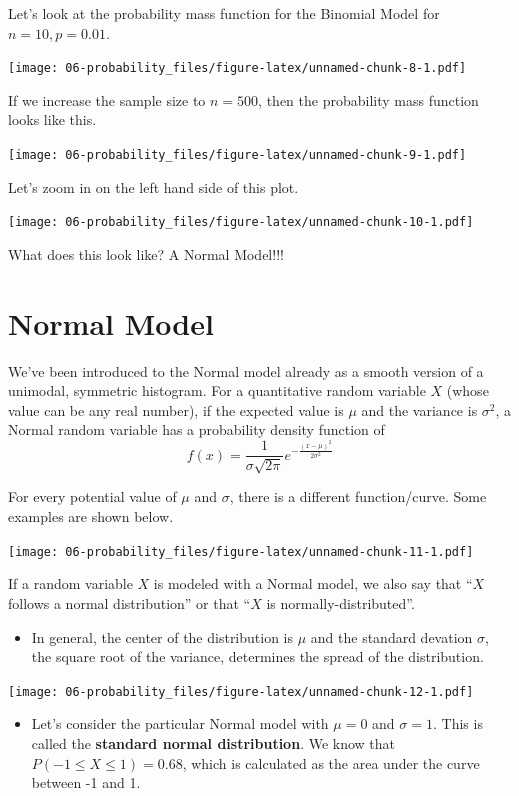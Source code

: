 \documentclass[
]{book}
\providecommand{\tightlist}{%
  \setlength{\itemsep}{0pt}\setlength{\parskip}{0pt}}
\begin{document}
Let's look at the probability mass function for the Binomial Model for \(n = 10, p = 0.01\).

\texttt{[image: 06-probability\_files/figure-latex/unnamed-chunk-8-1.pdf]}

If we increase the sample size to \(n = 500\), then the probability mass function looks like this.

\texttt{[image: 06-probability\_files/figure-latex/unnamed-chunk-9-1.pdf]}

Let's zoom in on the left hand side of this plot.

\texttt{[image: 06-probability\_files/figure-latex/unnamed-chunk-10-1.pdf]}

What does this look like? A Normal Model!!!

\hypertarget{normal-model}{%
\section{Normal Model}\label{normal-model}}

We've been introduced to the Normal model already as a smooth version of a unimodal, symmetric histogram. For a quantitative random variable \(X\) (whose value can be any real number), if the expected value is \(\mu\) and the variance is \(\sigma^2\), a Normal random variable has a probability density function of
\[f(x) =  \frac{1}{\sigma\sqrt{2\pi}}e^{-\frac{(x-\mu)^2}{2\sigma^2}}\]

For every potential value of \(\mu\) and \(\sigma\), there is a different function/curve. Some examples are shown below.

\texttt{[image: 06-probability\_files/figure-latex/unnamed-chunk-11-1.pdf]}

If a random variable \(X\) is modeled with a Normal model, we also say that ``\(X\) follows a normal distribution'' or that ``\(X\) is normally-distributed''.

\begin{itemize}
\tightlist
\item
  In general, the center of the distribution is \(\mu\) and the standard devation \(\sigma\), the square root of the variance, determines the spread of the distribution.
\end{itemize}

\texttt{[image: 06-probability\_files/figure-latex/unnamed-chunk-12-1.pdf]}

\begin{itemize}
\tightlist
\item
  Let's consider the particular Normal model with \(\mu=0\) and \(\sigma=1\). This is called the \textbf{standard normal distribution}. We know that \(P(-1\leq X \leq 1) = 0.68\), which is calculated as the area under the curve between -1 and 1.
\end{itemize}
\end{document}
